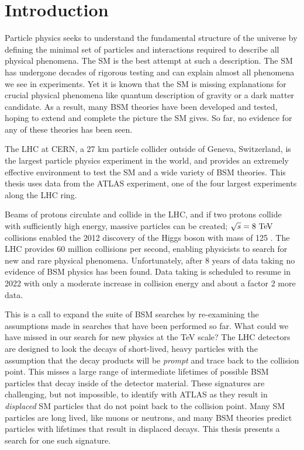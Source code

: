 \chapter{Introduction}

Particle physics seeks to understand the fundamental structure of the universe by defining the minimal set of particles and interactions required to describe all physical phenomena. The \acf{SM} is the best attempt at such a description. The \ac{SM} has undergone decades of rigorous testing and can explain almost all phenomena we see in experiments. Yet it is known that the \ac{SM} is missing explanations for crucial physical phenomena like quantum description of gravity or a dark matter candidate. As a result, many \acf{BSM} theories have been developed and tested, hoping to extend and complete the picture the \ac{SM} gives. So far, no evidence for any of these theories has been seen.  

The \acf{LHC} at \acf{CERN}, a 27 km particle collider outside of Geneva, Switzerland, is the largest particle physics experiment in the world, and provides an extremely effective environment to test the \ac{SM} and a wide variety of \ac{BSM} theories. This thesis uses data from the \acf{ATLAS} experiment, one of the four largest experiments along the \ac{LHC} ring.

Beams of protons circulate and collide in the \ac{LHC}, and if two protons collide with sufficiently high energy, massive particles can be created; $\sqrt{s} = 8 \TeV$ collisions enabled the 2012 discovery of the Higgs boson with mass of 125 \GeV. The \ac{LHC} provides 60 million collisions per second, enabling physicists to search for new and rare physical phenomena. Unfortunately, after 8 years of data taking no evidence of \ac{BSM} physics has been found. Data taking is scheduled to resume in 2022 with only a moderate increase in collision energy and about a factor 2 more data. 

This is a call to expand the suite of \ac{BSM} searches by re-examining the assumptions made in searches that have been performed so far. What could we have missed in our search for new physics at the TeV scale? The \ac{LHC} detectors are designed to look the decays of short-lived, heavy particles with the assumption that the decay products will be \emph{prompt} and trace back to the collision point. This misses a large range of intermediate lifetimes of possible \ac{BSM} particles that decay inside of the detector material.  These signatures are challenging, but not impossible, to identify with \ac{ATLAS} as they result in \emph{displaced} \ac{SM} particles that do not point back to the collision point. Many \ac{SM} particles are long lived, like muons or neutrons, and many \ac{BSM} theories predict particles with lifetimes that result in displaced decays. This thesis presents a search for one such signature.

